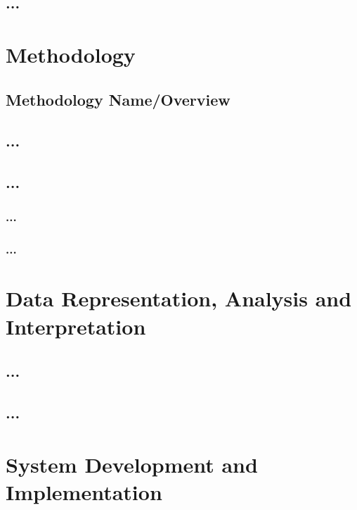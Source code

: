 \section{...}

\chapter{Methodology}\label{chapter:Methodology}
\section{Methodology Name/Overview}


\section{...}


\section{...}

\subsection{...}

\subsection{...}

\chapter{Data Representation, Analysis and Interpretation}\label{chapter:Results}
\section{...}

\section{...}

\chapter{System Development and Implementation}\label{chapter:System}
